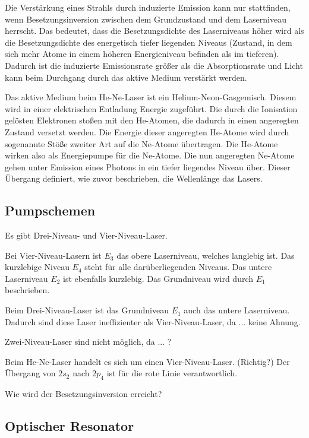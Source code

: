 Die Verstärkung eines Strahls durch induzierte Emission kann nur stattfinden, wenn Besetzungsinversion zwischen dem Grundzustand und dem Laserniveau herrscht. Das bedeutet, dass die Besetzungsdichte des Laserniveaus höher wird als die Besetzungsdichte des energetisch tiefer liegenden Niveaus (Zustand, in dem sich mehr Atome in einem höheren Energieniveau befinden als im tieferen). Dadurch ist die induzierte Emissionsrate größer als die Absorptionsrate und Licht kann beim Durchgang durch das aktive Medium verstärkt werden.

Das aktive Medium beim He-Ne-Laser ist ein Helium-Neon-Gasgemisch. Diesem wird in einer elektrischen Entladung Energie zugeführt. Die durch die Ionisation gelösten Elektronen stoßen mit den He-Atomen, die dadurch in einen angeregten Zustand versetzt werden. Die Energie dieser angeregten He-Atome wird durch sogenannte Stöße zweiter Art auf die Ne-Atome übertragen. Die He-Atome wirken also als Energiepumpe für die Ne-Atome. Die nun angeregten Ne-Atome gehen unter Emission eines Photons in ein tiefer liegendes Niveau über. Dieser Übergang definiert, wie zuvor beschrieben, die Wellenlänge das Lasers.

\subsection{Pumpschemen}
Es gibt Drei-Niveau- und Vier-Niveau-Laser.

Bei Vier-Niveau-Lasern ist $E_3$ das obere Laserniveau, welches langlebig ist. Das kurzlebige Niveau $E_4$ steht für alle darüberliegenden Niveaus. Das untere Laserniveau $E_2$ ist ebenfalls kurzlebig. Das Grundniveau wird durch $E_1$ beschrieben.

Beim Drei-Niveau-Laser ist das Grundniveau $E_1$ auch das untere Laserniveau. Dadurch sind diese Laser ineffizienter als Vier-Niveau-Laser, da ... keine Ahnung.

Zwei-Niveau-Laser sind nicht möglich, da ... ?

Beim He-Ne-Laser handelt es sich um einen Vier-Niveau-Laser. (Richtig?)
Der Übergang von $2s_2$ nach $2p_4$ ist für die rote Linie verantwortlich.

Wie wird der Besetzungsinversion erreicht?

\subsection{Optischer Resonator}

